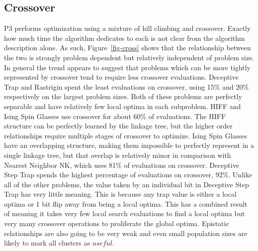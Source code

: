 \documentclass[twoside]{article}
\begin{document}
\subsection{Crossover}
P3 performs optimization using a mixture of hill climbing and crossover. Exactly how much time the algorithm
dedicates to each is not clear from the algorithm description alone. As such, Figure~\ref{fig-cross} shows
that the relationship between the two is strongly problem dependent but relatively independent of problem size.
In general the trend appears to suggest that problems which can be more tightly represented by crossover tend
to require less crossover evaluations. Deceptive Trap and Rastrigin spent the least evaluations on crossover, using
15\% and 20\% respectively on the largest problem sizes. Both of these problems are perfectly separable and have relatively
few local optima in each subproblem. HIFF and Ising Spin Glasses use crossover for about 60\% of evaluations. The HIFF structure can
be perfectly learned by the linkage tree, but the higher order relationships require multiple stages of crossover to optimize.
Ising Spin Glasses have an overlapping structure, making them impossible to perfectly represent in a single linkage tree, but
that overlap is relatively minor in comparison with Nearest Neighbor NK, which uses 81\% of evaluations on crossover. Deceptive Step Trap spends the highest
percentage of evaluations on crossover, 92\%. Unlike all of the other problems, the value taken by an individual bit in Deceptive
Step Trap has very little meaning. This is because any trap value is either a local optima or 1 bit flip away from being a local optima.
This has a combined result of meaning it takes very few local search evaluations to find a local optima but very many crossover operations
to proliferate the global optima. Epistatic relationships are also going to be very weak and even small population sizes are likely
to mark all clusters as $useful$.
\end{document}
